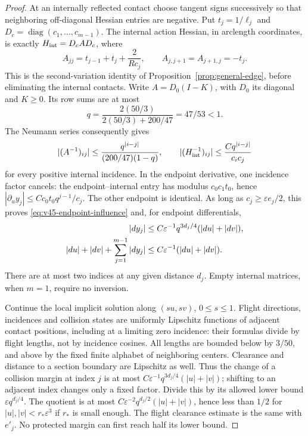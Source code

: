 \begin{proof}
At an internally reflected contact choose tangent signs successively
so that neighboring off-diagonal Hessian entries are negative. Put
$t_j=1/\ell_j$ and $D_c=\operatorname{diag}(c_1,\ldots,c_{m-1})$.
The internal action Hessian, in arclength coordinates, is exactly
$H_{\rm int}=D_c A D_c$, where
\begin{equation}\label{eq:v45-contact-matrix}
 A_{jj}=t_{j-1}+t_j+\frac{2}{Rc_j},\qquad
 A_{j,j+1}=A_{j+1,j}=-t_j.
\end{equation}
This is the second-variation identity of
Proposition~\ref{prop:general-edge}, before eliminating the internal
contacts. Write $A=D_0(I-K)$, with $D_0$ its diagonal and $K\ge0$.
Its row sums are at most
\[
 q=\frac{2(50/3)}{2(50/3)+200/47}=47/53<1.
\]
The Neumann series consequently gives
\begin{equation}\label{eq:v45-inverse-contact}
 |(A^{-1})_{ij}|\le\frac{q^{|i-j|}}{(200/47)(1-q)},\qquad
 |(H_{\rm int}^{-1})_{ij}|\le
                       \frac{Cq^{|i-j|}}{c_ic_j}
\end{equation}
for every positive internal incidence. In the endpoint derivative,
one incidence factor cancels: the endpoint--internal entry has modulus
$c_0c_1t_0$, hence
$|\partial_u y_j|\le Cc_0t_0q^{j-1}/c_j$. The other endpoint is
identical. As long as $c_j\ge\varepsilon e_j/2$, this proves
\eqref{eq:v45-endpoint-influence} and, for endpoint differentials,
\begin{align}
 |dy_j|&\le C\varepsilon^{-1}q^{3d_j/4}(|du|+|dv|),\notag\\
 |du|+|dv|+\sum_{j=1}^{m-1}|dy_j|
                &\le C\varepsilon^{-1}(|du|+|dv|).
 \label{eq:v45-summed-influence}
\end{align}
There are at most two indices at any given distance $d_j$. Empty
internal matrices, when $m=1$, require no inversion.

Continue the local implicit solution along $(su,sv)$, $0\le s\le1$.
Flight directions, incidences and collision states are uniformly
Lipschitz functions of adjacent contact positions, including at a
limiting zero incidence: their formulas divide by flight lengths, not
by incidence cosines. All lengths are bounded below by $3/50$, and
above by the fixed finite alphabet of neighboring centers. Clearance
and distance to a section boundary are Lipschitz as well. Thus the
change of a collision margin at index $j$ is at most
$C\varepsilon^{-1}q^{3d_j/4}(|u|+|v|)$; shifting to an adjacent
index changes only a fixed factor. Divide this by its allowed lower
bound $\varepsilon q^{d_j/4}$. The quotient is at most
$C\varepsilon^{-2}q^{d_j/2}(|u|+|v|)$, hence less than $1/2$ for
$|u|,|v|<r_*\varepsilon^3$ if $r_*$ is small enough. The flight
clearance estimate is the same with $e'_j$. No protected margin can
first reach half its lower bound.


\end{proof}
